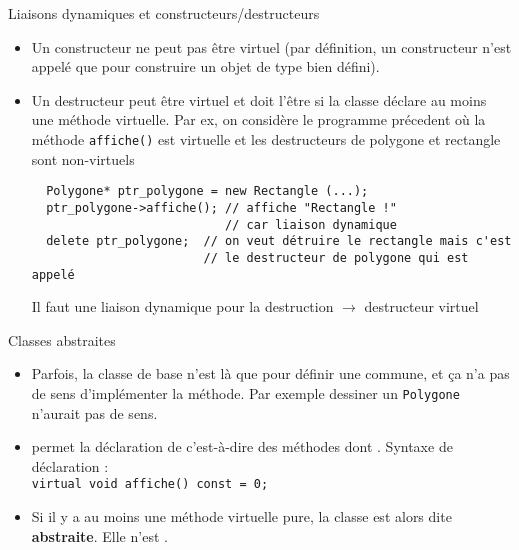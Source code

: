 \documentclass[c]{beamer}
\newcommand{\inline}[1]{\texttt{#1}}
\begin{document}

\begin{frame}[fragile]{Liaisons dynamiques et constructeurs/destructeurs}

\begin{itemize}
\item Un constructeur ne peut pas être virtuel (par définition, un constructeur n'est appelé que pour construire un objet de type bien défini).

\item Un destructeur peut être virtuel et doit l'être si la classe déclare au moins une méthode virtuelle. Par ex, on considère le programme précedent où la méthode \texttt{affiche()} est virtuelle et les destructeurs de polygone et rectangle sont non-virtuels
\begin{verbatim}
  Polygone* ptr_polygone = new Rectangle (...);
  ptr_polygone->affiche(); // affiche "Rectangle !"
                           // car liaison dynamique
  delete ptr_polygone;  // on veut détruire le rectangle mais c'est
                        // le destructeur de polygone qui est appelé   
\end{verbatim}
Il faut une liaison dynamique pour la destruction $\rightarrow$ destructeur virtuel 
\end{itemize}
    

\end{frame}


\begin{frame}[fragile]{Classes abstraites}
\begin{itemize}
\item Parfois, la classe de base n'est là que pour définir une  commune, et ça n'a pas de sens d'implémenter la méthode. Par exemple dessiner un \inline{Polygone} n'aurait pas de sens.

\item \Cpp permet la déclaration de  c'est-à-dire des
méthodes dont . Syntaxe de déclaration :\\
\inline{virtual void affiche() const = 0;}

\item Si il y a au moins une méthode virtuelle pure, la classe est alors dite \textbf{abstraite}. Elle n'est .
\end{itemize}
\end{frame}
\end{document}
